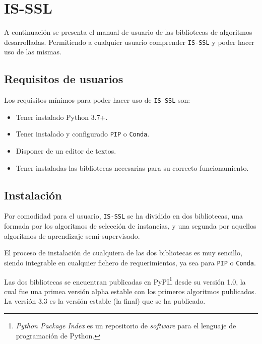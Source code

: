 \FloatBarrier
\clearpage
\section{IS-SSL}
A continuación se presenta el manual de usuario de las bibliotecas de algoritmos desarrolladas. Permitiendo a cualquier usuario comprender \texttt{IS-SSL} y poder hacer uso de las mismas.
\subsection{Requisitos de usuarios}
Los requisitos mínimos para poder hacer uso de \texttt{IS-SSL} son:
\begin{itemize}
\item Tener instalado Python 3.7+.
\item Tener instalado y configurado \texttt{PIP} o \texttt{Conda}.
\item Disponer de un editor de textos.
\item Tener instaladas las bibliotecas necesarias para su correcto funcionamiento.
\end{itemize}

\subsection{Instalación}

Por comodidad para el usuario, \texttt{IS-SSL} se ha dividido en dos bibliotecas, una formada por los algoritmos de selección de instancias, y una segunda por aquellos algoritmos de aprendizaje semi-supervisado.

El proceso de instalación de cualquiera de las dos bibliotecas es muy sencillo, siendo integrable en cualquier fichero de requerimientos, ya sea para \texttt{PIP} o \texttt{Conda}.

Las dos bibliotecas se encuentran publicadas en PyPI\footnote{\textit{Python Package Index} es un repositorio de \textit{software} para el lenguaje de programación de Python.} desde su versión 1.0, la cual fue una primea versión alpha estable con los primeros algoritmos publicados. 
La versión 3.3 es la versión estable (la final) que se ha publicado.


